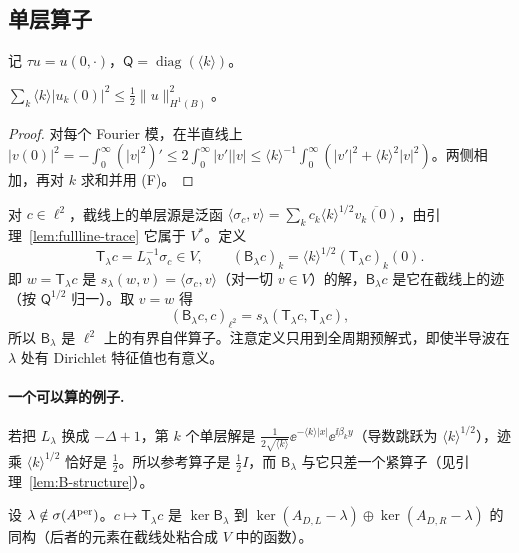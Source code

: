 \documentclass[11pt,a4paper,fontset=fandol]{ctexart}
\begin{document}
\subsection{单层算子}

记 $\tau u=u(0,\cdot)$，$\mathsf Q=\operatorname{diag}(\langle k\rangle)$。

\begin{lemma}[全线迹不等式]
\label{lem:fullline-trace}
$\displaystyle\sum_k\langle k\rangle|u_k(0)|^2\le\tfrac12\|u\|_{H^1(B)}^2$。
\end{lemma}

\begin{proof}
对每个 Fourier 模，在半直线上 $|v(0)|^2=-\int_0^\infty(|v|^2)'\le2\int_0^\infty|v'||v|\le\langle k\rangle^{-1}\int_0^\infty(|v'|^2+\langle k\rangle^2|v|^2)$。两侧相加，再对 $k$ 求和并用 (F)。
\end{proof}

对 $c\in\ell^2$，截线上的单层源是泛函 $\langle\sigma_c,v\rangle=\sum_kc_k\langle k\rangle^{1/2}\overline{v_k(0)}$，由引理~\ref{lem:fullline-trace} 它属于 $V^*$。定义
\begin{equation}
\label{eq:single-layer}
\mathsf T_\lambda c=L_\lambda^{-1}\sigma_c\in V,\qquad (\mathsf B_\lambda c)_k=\langle k\rangle^{1/2}(\mathsf T_\lambda c)_k(0).
\end{equation}
即 $w=\mathsf T_\lambda c$ 是 $s_\lambda(w,v)=\langle\sigma_c,v\rangle$（对一切 $v\in V$）的解，$\mathsf B_\lambda c$ 是它在截线上的迹（按 $\mathsf Q^{1/2}$ 归一）。取 $v=w$ 得
\begin{equation}
\label{eq:B-form}
(\mathsf B_\lambda c,c)_{\ell^2}=s_\lambda(\mathsf T_\lambda c,\mathsf T_\lambda c),
\end{equation}
所以 $\mathsf B_\lambda$ 是 $\ell^2$ 上的有界自伴算子。注意定义只用到全周期预解式，即使半导波在 $\lambda$ 处有 Dirichlet 特征值也有意义。

\paragraph{一个可以算的例子.} 若把 $L_\lambda$ 换成 $-\Delta+1$，第 $k$ 个单层解是 $\frac1{2\sqrt{\langle k\rangle}}\ee^{-\langle k\rangle|x|}\ee^{\ii\beta_ky}$（导数跳跃为 $\langle k\rangle^{1/2}$），迹乘 $\langle k\rangle^{1/2}$ 恰好是 $\tfrac12$。所以参考算子是 $\tfrac12I$，而 $\mathsf B_\lambda$ 与它只差一个紧算子（见引理~\ref{lem:B-structure}）。

\begin{lemma}[核与表面态]
\label{lem:B-kernel}
设 $\lambda\notin\sigma(A^{\rm per})$。$c\mapsto\mathsf T_\lambda c$ 是 $\ker\mathsf B_\lambda$ 到 $\ker(A_{D,L}-\lambda)\oplus\ker(A_{D,R}-\lambda)$ 的同构（后者的元素在截线处粘合成 $V$ 中的函数）。
\end{lemma}
\end{document}
